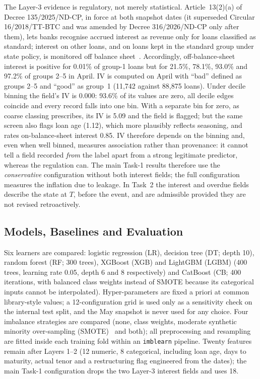 \documentclass[runningheads]{llncs}
\begin{document}
The Layer-3 evidence is regulatory, not merely statistical. Article~13(2)(a) of Decree 135/2025/ND-CP, in force at both snapshot dates (it superseded Circular 16/2018/TT-BTC and was amended by Decree 316/2026/ND-CP only after them), lets banks recognise accrued interest as revenue only for loans classified as standard; interest on other loans, and on loans kept in the standard group under state policy, is monitored off balance sheet~\cite{gov2025nd135}. Accordingly, off-balance-sheet interest is positive for 0.01\% of group-1 loans but for 21.5\%, 78.1\%, 93.0\% and 97.2\% of groups 2--5 in April. IV is computed on April with ``bad'' defined as groups 2--5 and ``good'' as group~1 (11,742 against 88,875 loans). Under decile binning the field's IV is 0.000: 93.6\% of its values are zero, all decile edges coincide and every record falls into one bin. With a separate bin for zero, as coarse classing prescribes, its IV is 5.09 and the field is flagged; but the same screen also flags loan age (1.12), which more plausibly reflects seasoning, and rates on-balance-sheet interest 0.85. IV therefore depends on the binning and, even when well binned, measures association rather than provenance: it cannot tell a field recorded \emph{from} the label apart from a strong legitimate predictor, whereas the regulation can. The main Task-1 results therefore use the \emph{conservative} configuration without both interest fields; the full configuration measures the inflation due to leakage. In Task~2 the interest and overdue fields describe the state at $T$, before the event, and are admissible provided they are not revised retroactively.

\subsection{Models, Baselines and Evaluation}
\label{sec:eval}

Six learners are compared: logistic regression (LR), decision tree (DT; depth 10), random forest (RF; 300 trees), XGBoost (XGB) and LightGBM (LGBM) (400 trees, learning rate 0.05, depth 6 and 8 respectively) and CatBoost (CB; 400 iterations, with balanced class weights instead of SMOTE because its categorical inputs cannot be interpolated). Hyper-parameters are fixed a priori at common library-style values; a 12-configuration grid is used only as a sensitivity check on the internal test split, and the May snapshot is never used for any choice. Four imbalance strategies are compared (none, class weights, moderate synthetic minority over-sampling (SMOTE)~\cite{chawla2002smote} and both); all preprocessing and resampling are fitted inside each training fold within an \texttt{imblearn} pipeline. Twenty features remain after Layers 1--2 (12 numeric, 8 categorical, including loan age, days to maturity, actual tenor and a restructuring flag engineered from the dates); the main Task-1 configuration drops the two Layer-3 interest fields and uses 18.
\end{document}
